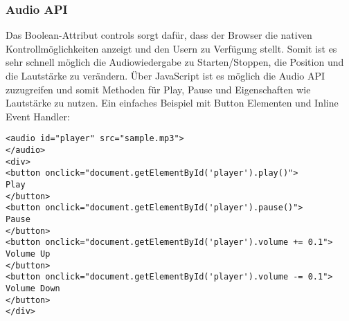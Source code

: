 \subsubsection{Audio API}
Das Boolean-Attribut controls sorgt dafür, dass der Browser die nativen Kontrollmöglichkeiten
anzeigt und den Usern zu Verfügung stellt. Somit ist es sehr schnell möglich die Audiowiedergabe
zu Starten/Stoppen, die Position und die Lautstärke zu verändern.
Über JavaScript ist es möglich die Audio API zuzugreifen und somit Methoden für Play, Pause und
Eigenschaften wie Lautstärke zu nutzen. Ein einfaches Beispiel mit Button Elementen und
Inline Event Handler:
\begin{verbatim}
<audio id="player" src="sample.mp3">
</audio>
<div>
<button onclick="document.getElementById('player').play()">
Play
</button>
<button onclick="document.getElementById('player').pause()">
Pause
</button>
<button onclick="document.getElementById('player').volume += 0.1">
Volume Up
</button>
<button onclick="document.getElementById('player').volume -= 0.1">
Volume Down
</button>
</div>
\end{verbatim}

